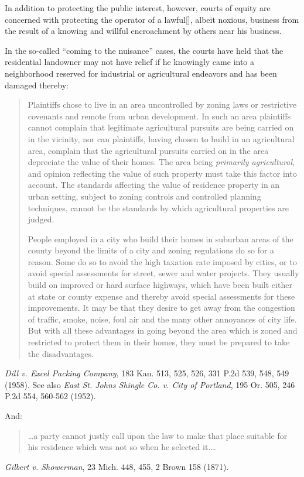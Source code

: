 In addition to protecting the public interest, however, courts of equity are
concerned with protecting the operator of a lawful[], albeit noxious, business
from the result of a knowing and willful encroachment by others near his
business.

In the so-called ``coming to the nuisance'' cases, the courts have held that the
residential landowner may not have relief if he knowingly came into a
neighborhood reserved for industrial or agricultural endeavors and has been
damaged thereby:
\begin{quotation}
Plaintiffs chose to live in an area uncontrolled by zoning laws or
restrictive covenants and remote from urban development. In such an area
plaintiffs cannot complain that legitimate agricultural pursuits are being
carried on in the vicinity, nor can plaintiffs, having chosen to build in an
agricultural area, complain that the agricultural pursuits carried on in the
area depreciate the value of their homes. The area being \emph{primarily
agricultural},
and opinion reflecting the value of such property must take this factor into
account. The standards affecting the value of residence property in an urban
setting, subject to zoning controls and controlled planning techniques, cannot
be the standards by which agricultural properties are judged.

People employed in a city who build their homes in suburban areas of the
county beyond the limits of a city and zoning regulations do so for a reason.
Some do so to avoid the high taxation rate imposed by cities, or to avoid
special assessments for street, sewer and water projects. They usually build on
improved or hard surface highways, which have been built either at state or
county expense and thereby avoid special assessments for these improvements. It
may be that they desire to get away from the congestion of traffic, smoke,
noise, foul air and the many other annoyances of city life. But with all these
advantages in going beyond the area which is zoned and restricted to protect
them in their homes, they must be prepared to take the disadvantages.
\end{quotation}
\emph{Dill v. Excel Packing Company}, 183 Kan. 513, 525, 526, 331 P.2d 539, 548,
549 (1958). See also \emph{East St. Johns Shingle Co. v. City of Portland}, 195
Or. 505, 246 P.2d 554, 560-562 (1952).

And:
\begin{quote}
\ldots a party cannot justly call upon the law to make that place suitable for
his residence which was not so when he selected it.\ldots
\end{quote}
\emph{Gilbert v. Showerman}, 23 Mich. 448, 455, 2 Brown 158 (1871).

